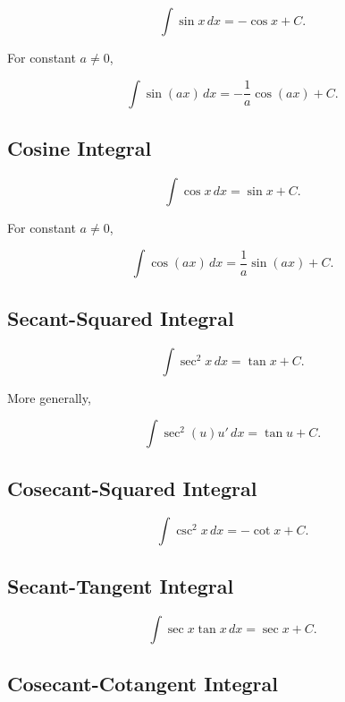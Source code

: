 \[
\boxed{
\int\sin x\,dx
=
-\cos x+C.
}
\]

For constant \(a\neq0\),

\[
\boxed{
\int\sin(ax)\,dx
=
-\frac1a\cos(ax)+C.
}
\]

\subsection{Cosine Integral}
\label{subsec:cosine-integral-reference}

\[
\boxed{
\int\cos x\,dx
=
\sin x+C.
}
\]

For constant \(a\neq0\),

\[
\boxed{
\int\cos(ax)\,dx
=
\frac1a\sin(ax)+C.
}
\]

\subsection{Secant-Squared Integral}
\label{subsec:secant-squared-integral}

\[
\boxed{
\int\sec^2x\,dx
=
\tan x+C.
}
\]

More generally,

\[
\boxed{
\int
\sec^2(u)
u'\,dx
=
\tan u+C.
}
\]

\subsection{Cosecant-Squared Integral}
\label{subsec:cosecant-squared-integral}

\[
\boxed{
\int\csc^2x\,dx
=
-\cot x+C.
}
\]

\subsection{Secant-Tangent Integral}
\label{subsec:secant-tangent-integral}

\[
\boxed{
\int
\sec x\tan x
\,dx
=
\sec x+C.
}
\]

\subsection{Cosecant-Cotangent Integral}
\label{subsec:cosecant-cotangent-integral}

